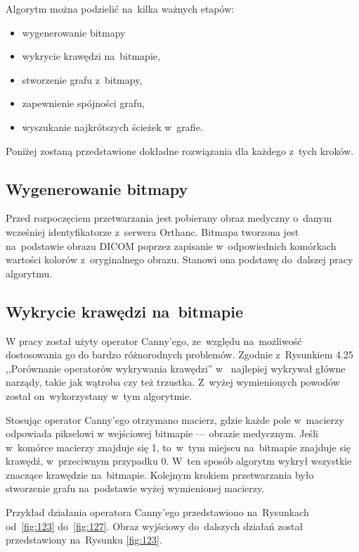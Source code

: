 \documentclass[a4paper,11pt,twoside,openright]{report}
\theoremstyle{definition}
\begin{document}
Algorytm można podzielić na~kilka ważnych etapów:

\begin{itemize}[noitemsep]
\item {wygenerowanie bitmapy}
\item {wykrycie krawędzi na~bitmapie,}
\item {stworzenie grafu z~bitmapy,}
\item {zapewnienie spójności grafu,}
\item {wyszukanie najkrótszych ścieżek w~grafie.}
\end{itemize}

Poniżej zostaną przedstawione dokładne rozwiązania dla każdego z~tych kroków.

\subsection {Wygenerowanie bitmapy}

Przed rozpoczęciem przetwarzania jest pobierany obraz medyczny o~danym wcześniej
identyfikatorze z~serwera Orthanc. Bitmapa tworzona jest na~podstawie obrazu DICOM poprzez
zapisanie w~odpowiednich komórkach wartości kolorów z~oryginalnego obrazu.
Stanowi ona podstawę do~dalszej pracy algorytmu.

\subsection {Wykrycie krawędzi na~bitmapie}

W pracy został użyty operator Canny'ego, ze~względu na~możliwość dostosowania go
do bardzo różnorodnych problemów. Zgodnie z~Rysunkiem 4.25 %
,,Porównanie operatorów wykrywania krawędzi'' w~\cite{Cyfrowe przetwarzanie obrazów medycznych}
najlepiej wykrywał główne narządy, takie jak wątroba czy też trzustka. Z~wyżej
wymienionych powodów został on~wykorzystany w~tym algorytmie.

Stosując operator Canny'ego otrzymano macierz, gdzie każde pole w~macierzy odpowiada pikselowi
w wejściowej bitmapie --- obrazie medycznym. Jeśli w~komórce macierzy znajduje
się 1, to~w~tym miejscu na~bitmapie znajduje się krawędź, w~przeciwnym przypadku
0. W~ten sposób algorytm wykrył wszystkie znaczące krawędzie na~bitmapie. Kolejnym
krokiem przetwarzania było stworzenie grafu na~podstawie wyżej wymienionej macierzy.

Przykład działania operatora Canny'ego przedstawiono na~Rysunkach od~\ref{fig:123} do~\ref{fig:127}.
Obraz wyjściowy do~dalszych działań został przedstawiony na~Rysunku \ref{fig:123}.
\end{document}
